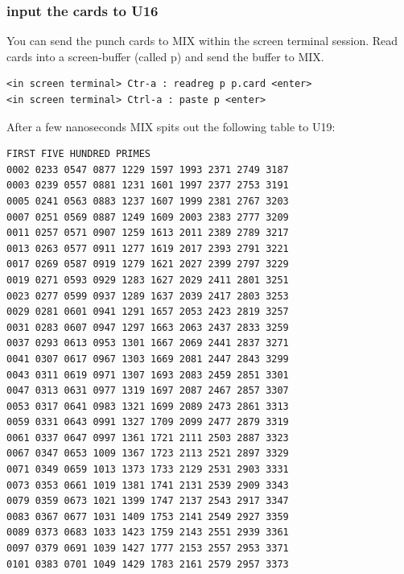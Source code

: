 \documentclass[a4paper,ngerman]{scrartcl}
\begin{document}
\subsubsection{input the cards to U16}
You can send the punch cards to MIX within the screen terminal session.
Read cards into a screen-buffer (called p) and send the buffer to MIX.
\begin{lstlisting}
<in screen terminal> Ctr-a : readreg p p.card <enter>
<in screen terminal> Ctrl-a : paste p <enter>
\end{lstlisting}

After a few nanoseconds MIX spits out the following table to U19:

\begin{lstlisting}
FIRST FIVE HUNDRED PRIMES                                                 
0002 0233 0547 0877 1229 1597 1993 2371 2749 3187                    
0003 0239 0557 0881 1231 1601 1997 2377 2753 3191                    
0005 0241 0563 0883 1237 1607 1999 2381 2767 3203                    
0007 0251 0569 0887 1249 1609 2003 2383 2777 3209                    
0011 0257 0571 0907 1259 1613 2011 2389 2789 3217                    
0013 0263 0577 0911 1277 1619 2017 2393 2791 3221                    
0017 0269 0587 0919 1279 1621 2027 2399 2797 3229                    
0019 0271 0593 0929 1283 1627 2029 2411 2801 3251                    
0023 0277 0599 0937 1289 1637 2039 2417 2803 3253                    
0029 0281 0601 0941 1291 1657 2053 2423 2819 3257                    
0031 0283 0607 0947 1297 1663 2063 2437 2833 3259                    
0037 0293 0613 0953 1301 1667 2069 2441 2837 3271                    
0041 0307 0617 0967 1303 1669 2081 2447 2843 3299                    
0043 0311 0619 0971 1307 1693 2083 2459 2851 3301                    
0047 0313 0631 0977 1319 1697 2087 2467 2857 3307                    
0053 0317 0641 0983 1321 1699 2089 2473 2861 3313                    
0059 0331 0643 0991 1327 1709 2099 2477 2879 3319                    
0061 0337 0647 0997 1361 1721 2111 2503 2887 3323                    
0067 0347 0653 1009 1367 1723 2113 2521 2897 3329                    
0071 0349 0659 1013 1373 1733 2129 2531 2903 3331                    
0073 0353 0661 1019 1381 1741 2131 2539 2909 3343                    
0079 0359 0673 1021 1399 1747 2137 2543 2917 3347                    
0083 0367 0677 1031 1409 1753 2141 2549 2927 3359                    
0089 0373 0683 1033 1423 1759 2143 2551 2939 3361                    
0097 0379 0691 1039 1427 1777 2153 2557 2953 3371                    
0101 0383 0701 1049 1429 1783 2161 2579 2957 3373                    

\end{lstlisting}
\end{document}
